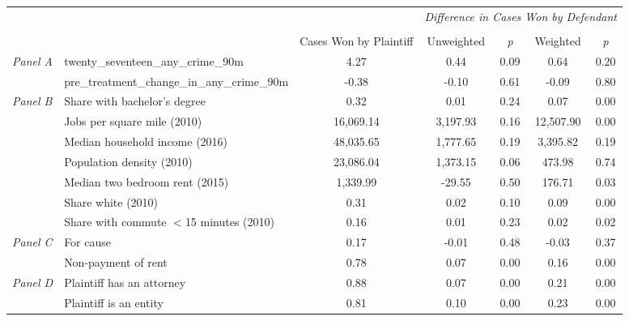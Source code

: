 \begin{tabular}{llccccc}
\toprule
 &  & \textit{} & \multicolumn{4}{c}{\textit{Difference in Cases Won by Defendant}} \\
\cline{4-7}
\\
 &  & Cases Won by Plaintiff & Unweighted & \emph{p} & Weighted & \emph{p} \\
\midrule
\multirow[c]{2}{3cm}{\textit{Panel A}} & twenty_seventeen_any_crime_90m & 4.27 & 0.44 & 0.09 & 0.64 & 0.20 \\
 & pre_treatment_change_in_any_crime_90m & -0.38 & -0.10 & 0.61 & -0.09 & 0.80 \\
\cline{1-7}
\multirow[c]{7}{3cm}{\textit{Panel B}} & Share with bachelor's degree & 0.32 & 0.01 & 0.24 & 0.07 & 0.00 \\
 & Jobs per square mile (2010) & 16,069.14 & 3,197.93 & 0.16 & 12,507.90 & 0.00 \\
 & Median household income (2016) & 48,035.65 & 1,777.65 & 0.19 & 3,395.82 & 0.19 \\
 & Population density (2010) & 23,086.04 & 1,373.15 & 0.06 & 473.98 & 0.74 \\
 & Median two bedroom rent (2015) & 1,339.99 & -29.55 & 0.50 & 176.71 & 0.03 \\
 & Share white (2010) & 0.31 & 0.02 & 0.10 & 0.09 & 0.00 \\
 & Share with commute $<$15 minutes (2010) & 0.16 & 0.01 & 0.23 & 0.02 & 0.02 \\
\cline{1-7}
\multirow[c]{2}{3cm}{\textit{Panel C}} & For cause & 0.17 & -0.01 & 0.48 & -0.03 & 0.37 \\
 & Non-payment of rent & 0.78 & 0.07 & 0.00 & 0.16 & 0.00 \\
\cline{1-7}
\multirow[c]{2}{3cm}{\textit{Panel D}} & Plaintiff has an attorney & 0.88 & 0.07 & 0.00 & 0.21 & 0.00 \\
 & Plaintiff is an entity & 0.81 & 0.10 & 0.00 & 0.23 & 0.00 \\
\cline{1-7}
\bottomrule
\end{tabular}
